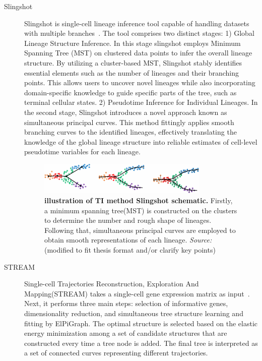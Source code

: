 \begin{description}
  \item[Slingshot]
  Slingshot is single-cell lineage inference tool capable of handling datasets with multiple branches~\citep{street2018slingshot}. The tool comprises two distinct stages: 1) Global Lineage Structure Inference. In this stage slingshot employs Minimum Spanning Tree (MST) on clustered data points to infer the overall lineage structure. By utilizing a cluster-based MST, Slingshot stably identifies essential elements such as the number of lineages and their branching points. This allows users to uncover novel lineages while also incorporating domain-specific knowledge to guide specific parts of the tree, such as terminal cellular states. 2) Pseudotime Inference for Individual Lineages. In the second stage, Slingshot introduces a novel approach known as simultaneous principal curves. This method fittingly applies smooth branching curves to the identified lineages, effectively translating the knowledge of the global lineage structure into reliable estimates of cell-level pseudotime variables for each lineage.
  \begin{figure}[ht!]
  	\centering
  	\includegraphics[width=0.8\textwidth]{TI_Alg_slingshot/fig}
  	\vspace{0.1cm}
  	\caption[Illustration of TI method Slingshot schematic.]{\textbf{illustration of TI method Slingshot schematic.}
  	Firstly, a minimum spanning tree(MST) is constructed on the clusters to determine the number and rough shape of lineages. Following that, simultaneous principal curves are employed to obtain smooth representations of each lineage. \emph{Source:~\cite{street2018slingshot}} (modified to fit thesis format and/or clarify key points)
  	}
  	\label{fig:TI_Alg_slingshot}
  \end{figure}

  \item[STREAM]
  Single-cell Trajectories Reconstruction, Exploration And Mapping(STREAM) takes a single-cell gene expression matrix as input~\citep{chen2019stream}. Next, it performs three main steps: selection of informative genes, dimensionality reduction, and simultaneous tree structure learning and fitting by ElPiGraph. The optimal structure is selected based on the elastic energy minimization among a set of candidate structures that are constructed every time a tree node is added. The final tree is interpreted as a set of connected curves representing different trajectories.


\end{description}
